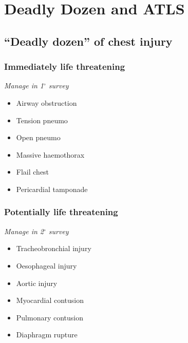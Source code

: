 \documentclass[
  14pt,
]{memoir}
\providecommand{\tightlist}{%
  \setlength{\itemsep}{0pt}\setlength{\parskip}{0pt}}
\begin{document}
\pagebreak

\hypertarget{deadly-dozen-and-atls}{%
\chapter{Deadly Dozen and ATLS}\label{deadly-dozen-and-atls}}

\hypertarget{deadly-dozen-of-chest-injury}{%
\section{``Deadly dozen'' of chest
injury}\label{deadly-dozen-of-chest-injury}}

\hypertarget{immediately-life-threatening}{%
\subsection{Immediately life
threatening}\label{immediately-life-threatening}}

\emph{Manage in 1\(^\circ\) survey}

\begin{itemize}
\tightlist
\item
  Airway obstruction
\item
  Tension pneumo
\item
  Open pneumo
\item
  Massive haemothorax
\item
  Flail chest
\item
  Pericardial tamponade
\end{itemize}

\hypertarget{potentially-life-threatening}{%
\subsection{Potentially life
threatening}\label{potentially-life-threatening}}

\emph{Manage in 2\(^\circ\) survey}

\begin{itemize}
\tightlist
\item
  Tracheobronchial injury
\item
  Oesophageal injury
\item
  Aortic injury
\item
  Myocardial contusion
\item
  Pulmonary contusion
\item
  Diaphragm rupture
\end{itemize}

\pagebreak
\end{document}
